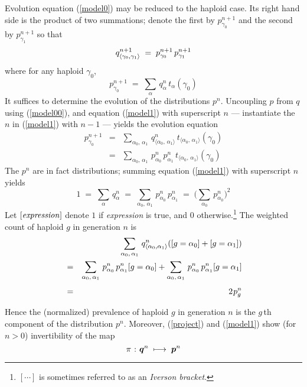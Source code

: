 Evolution equation (\ref{model0}) may be reduced to the haploid case.
Its right hand side is the product of two summations; denote the first
by $p_{\gamma_0}^{n+1}$ and the second by $p_{\gamma_1}^{n+1}$ so that
\begin{equation}
\label{model1}
q_{\langle \gamma_0, \gamma_1 \rangle}^{n+1} \; = \;
p_{\gamma_0}^{n+1} \, p_{\gamma_1}^{n+1}\\[.05in]
\end{equation}
where for any haploid $\gamma_0$,
\begin{equation}
\label{model00}
p_{\gamma_0}^{n+1} \; = \;
\sum_{\alpha} \,q_\alpha^n \, t_\alpha(\gamma_0)
\end{equation}
It suffices to determine the evolution of the distributions $p^{n}$.
Uncoupling \nudge $p$ \nudge from \nudge $q$ \nudge using
(\ref{model00}), and equation (\ref{model1}) with superscript $n$ ---
instantiate the $n$ in (\ref{model1}) with $n-1$ --- yields the
evolution equation
\begin{eqnarray}
\label{model2}
p_{\gamma_0}^{n+1} & = &
\sum_{\alpha_0, \, \alpha_1} \, q_{\langle \alpha_0, \,\alpha_1 \rangle}^n \,
t_{\langle \alpha_0, \,\alpha_1 \rangle}(\gamma_0) \nonumber \\
& = &
\sum_{\alpha_0, \, \alpha_1} \, p_{\alpha_0}^n \, p_{\alpha_1}^n \,
t_{\langle \alpha_0, \,\alpha_1 \rangle}(\gamma_0) 
\end{eqnarray}
The $p^n$ are in fact distributions; summing equation
(\ref{model1}) with superscript $n$ yields
\[
1 \; = \; \sum_\alpha \, q_\alpha^n \; = \;
\sum_{\alpha_0, \, \alpha_1} \, p_{\alpha_0}^n \, p_{\alpha_1}^n \; = \;
\Big( \sum_{\alpha_0} \, p_{\alpha_0}^n \Big)^2
\]
Let $[\mbox{\em expression\/} ]$ denote $1$ if {\em expression\/} is
true, and $0$ otherwise.\footnote{$[ \cdots ]$ is sometimes referred to
  as an {\em Iverson bracket}.}  The weighted count of haploid
$g$ in generation $n$ is
\begin{eqnarray}
\label{project}
  & &
  \sum_{\alpha_0, \, \alpha_1} \, q_{\langle \alpha_0, \alpha_1 \rangle}^n
([g = \alpha_0] + [g = \alpha_1]) \\ & = &
\sum_{\alpha_0, \, \alpha_1} \, p_{\alpha_0}^n \, p_{\alpha_1}^n [g = \alpha_0] + 
\sum_{\alpha_0, \, \alpha_1} \, p_{\alpha_0}^n \, p_{\alpha_1}^n [g = \alpha_1] \\[0.05in]
& = & 2 \hspace{0.01in} p_g^n
\end{eqnarray}

Hence the (normalized) prevalence of haploid $g$ in generation $n$ is
the $g\,$th component of the distribution $p^n$. \linebreak
Moreover, (\ref{project}) and (\ref{model1}) show (for $n >
0$) invertibility of the map
\[
  \pi \hspace{0.01in} : \hspace{0.01in} {\bm q}^{n} \; \longmapsto \; {\bm p}^{n}
\]


